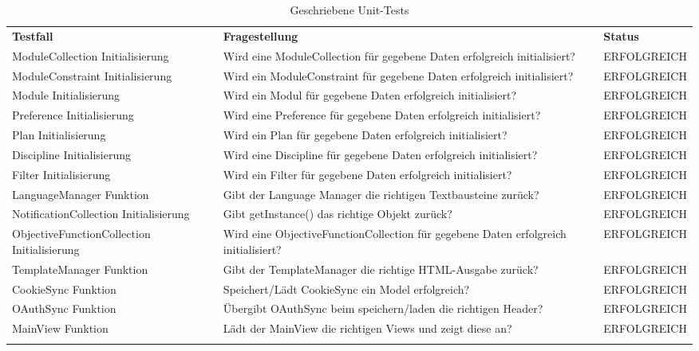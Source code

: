 \begin{longtable}{| >{\hspace{0pt}} p{} | >{\hspace{0pt}} p{} | >{\hspace{0pt}} p{} |}
	\hline
	\textbf{Testfall} & \textbf{Fragestellung} & \textbf{Status} \\ 
	\hhline{|=|=|=|}  
	\endfirsthead
	\endhead
	
	ModuleCollection Initialisierung & Wird eine ModuleCollection für gegebene Daten erfolgreich initialisiert?  & ERFOLGREICH \\
	ModuleConstraint Initialisierung & Wird ein ModuleConstraint für gegebene Daten erfolgreich initialisiert? & ERFOLGREICH \\
	Module Initialisierung & Wird ein Modul für gegebene Daten erfolgreich initialisiert? & ERFOLGREICH \\
	Preference Initialisierung & Wird eine Preference für gegebene Daten erfolgreich initialisiert? & ERFOLGREICH \\
	Plan Initialisierung & Wird ein Plan für gegebene Daten erfolgreich initialisiert? & ERFOLGREICH \\
	Discipline Initialisierung & Wird eine Discipline für gegebene Daten erfolgreich initialisiert? & ERFOLGREICH \\
	Filter Initialisierung & Wird ein Filter für gegebene Daten erfolgreich initialisiert? & ERFOLGREICH \\
	LanguageManager Funktion & Gibt der Language Manager die richtigen Textbausteine zurück? & ERFOLGREICH \\
	NotificationCollection Initialisierung & Gibt getInstance() das richtige Objekt zurück? & ERFOLGREICH \\
	ObjectiveFunctionCollection Initialisierung & Wird eine ObjectiveFunctionCollection für gegebene Daten erfolgreich initialisiert? & ERFOLGREICH \\
	TemplateManager Funktion & Gibt der TemplateManager die richtige HTML-Ausgabe zurück? & ERFOLGREICH \\
	CookieSync Funktion & Speichert/Lädt CookieSync ein Model erfolgreich? & ERFOLGREICH \\
	OAuthSync Funktion & Übergibt OAuthSync beim speichern/laden die richtigen Header? & ERFOLGREICH \\
	MainView Funktion & Lädt der MainView die richtigen Views und zeigt diese an? & ERFOLGREICH \\	
	\hhline{|=|=|=|}   
	\caption{Geschriebene Unit-Tests}
\end{longtable}
